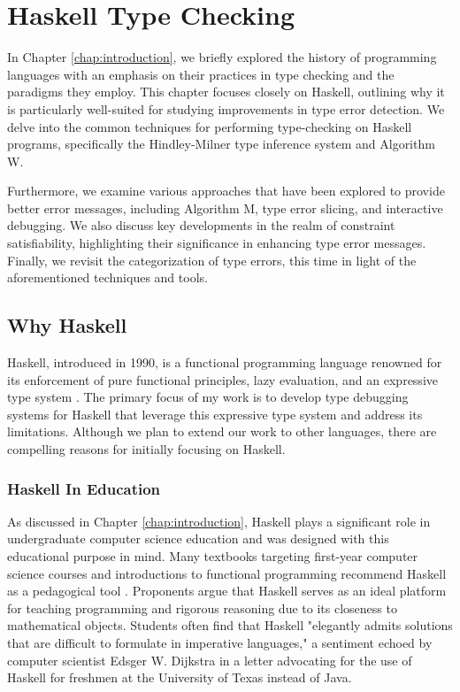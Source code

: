
\chapter{Haskell Type Checking} %

\label{chap:haskell-type-checking}

\graphicspath{{Figures/HaskellTypeChecking}}

In Chapter \ref{chap:introduction}, we briefly explored the history of programming languages with an emphasis on their practices in type checking and the paradigms they employ. This chapter focuses closely on Haskell, outlining why it is particularly well-suited for studying improvements in type error detection. We delve into the common techniques for performing type-checking on Haskell programs, specifically the Hindley-Milner type inference system and Algorithm W.

Furthermore, we examine various approaches that have been explored to provide better error messages, including Algorithm M, type error slicing, and interactive debugging. We also discuss key developments in the realm of constraint satisfiability, highlighting their significance in enhancing type error messages. Finally, we revisit the categorization of type errors, this time in light of the aforementioned techniques and tools.

\section{Why Haskell}

Haskell, introduced in 1990, is a functional programming language renowned for its enforcement of pure functional principles, lazy evaluation, and an expressive type system \cite{Hudak2007-kn}. The primary focus of my work is to develop type debugging systems for Haskell that leverage this expressive type system and address its limitations. Although we plan to extend our work to other languages, there are compelling reasons for initially focusing on Haskell.

\subsection{Haskell In Education}
As discussed in Chapter \ref{chap:introduction}, Haskell plays a significant role in undergraduate computer science education and was designed with this educational purpose in mind. Many textbooks targeting first-year computer science courses and introductions to functional programming recommend Haskell as a pedagogical tool \cite{Bird1998-kv, Davie1992-xv}. Proponents argue that Haskell serves as an ideal platform for teaching programming and rigorous reasoning due to its closeness to mathematical objects. Students often find that Haskell "elegantly admits solutions that are difficult to formulate in imperative languages," a sentiment echoed by computer scientist Edsger W. Dijkstra in a letter advocating for the use of Haskell for freshmen at the University of Texas instead of Java.

